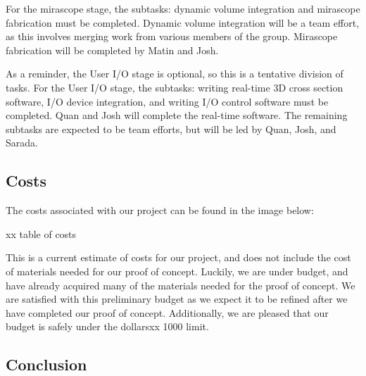 \documentclass[12pt]{article}
\begin{document}
For the mirascope stage, the subtasks: dynamic volume integration and mirascope fabrication must be completed. Dynamic volume integration will be a team effort, as this involves merging work from various members of the group. Mirascope fabrication will be completed by Matin and Josh. 

As a reminder, the User I/O stage is optional, so this is a tentative division of tasks. For the User I/O stage, the subtasks: writing real-time 3D cross section software, I/O device integration, and writing I/O control software must be completed. Quan and Josh will complete the real-time software. The remaining subtasks are expected to be team efforts, but will be led by Quan, Josh, and Sarada.

\subsection{Costs}
The costs associated with our project can be found in the image below:

xx table of costs

This is a current estimate of costs for our project, and does not include the cost of materials needed for our proof of concept. Luckily, we are under budget, and have already acquired many of the materials needed for the proof of concept. We are satisfied with this preliminary budget as we expect it to be refined after we have completed our proof of concept. Additionally, we are pleased that our budget is safely under the dollarsxx 1000 limit.

\subsection{Conclusion}

{}

\end{document}
